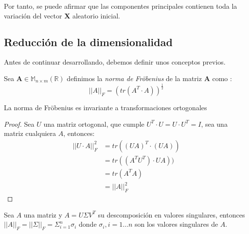 \noindent Por tanto, se puede afirmar que las componentes principales contienen toda la variación del vector \textbf{X} aleatorio inicial. 


%


\newpage
\subsection{Reducción de la dimensionalidad}

\noindent Antes de continuar desarrollando, debemos definir unos conceptos previos. 

\begin{defi}
Sea $\textbf{A}\in \mathbb{M}_{n\times m}(\mathbb{R})$ definimos la \textit{norma de Fröbenius} de la matriz \textbf{A} como :
\begin{equation}
||A||_F=(tr(A^T\cdot A))^{\frac{1}{2}}
\end{equation}

\end{defi}

\begin{propo}
La norma de Fröbenius es invariante a transformaciones ortogonales
\end{propo}

\begin{proof}
Sea $U$ una matriz ortogonal, que cumple $U^T\cdot U=U\cdot U^T=I$, sea una matriz cualquiera $A$, entonces:
\begin{align*}\tag{2.7}
||U \cdot A||_F^2&=tr((U A)^T\cdot(U A))\\
&=tr((A^T U^T)\cdot U A))\\
&=tr(A^T A)\\
&=||A||_F^2
\end{align*}
\qedhere
\end{proof}

\begin{coro}
Sea $A$ una matriz y $A=U \Sigma V^T$ su descomposición en valores singulares, entonces $||A||_F=||\Sigma||_F=\Sigma_{i=1}^n \sigma_i$ donde $\sigma_i, i=1 \ldots n$ son los valores singulares de $A$. 
\end{coro}

\begin{teorema}

\end{teorema}




%